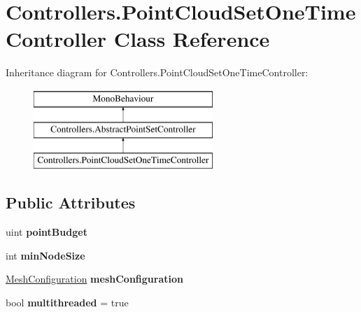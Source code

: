 \hypertarget{class_controllers_1_1_point_cloud_set_one_time_controller}{}\section{Controllers.\+Point\+Cloud\+Set\+One\+Time\+Controller Class Reference}
\label{class_controllers_1_1_point_cloud_set_one_time_controller}
Inheritance diagram for Controllers.\+Point\+Cloud\+Set\+One\+Time\+Controller\+:\begin{figure}[H]
\begin{center}
\leavevmode
\includegraphics[height=3.000000cm]{class_controllers_1_1_point_cloud_set_one_time_controller}
\end{center}
\end{figure}
\subsection*{Public Attributes}
\begin{DoxyCompactItemize}
\item 
\mbox{\label{class_controllers_1_1_point_cloud_set_one_time_controller_a3b44cbf21a49063a9f2d64ffe4147802}} 
uint {\bfseries point\+Budget}
\item 
\mbox{\label{class_controllers_1_1_point_cloud_set_one_time_controller_ad7a699c80cdcd10dc56ac948205f9de4}} 
int {\bfseries min\+Node\+Size}
\item 
\mbox{\label{class_controllers_1_1_point_cloud_set_one_time_controller_a20ba15a4209ad45a45b0ea5560a66088}} 
\hyperlink{class_object_creation_1_1_mesh_configuration}{Mesh\+Configuration} {\bfseries mesh\+Configuration}
\item 
\mbox{\label{class_controllers_1_1_point_cloud_set_one_time_controller_aaa3813d070269d1e779b4dccd4c09793}} 
bool {\bfseries multithreaded} = true
\end{DoxyCompactItemize}
